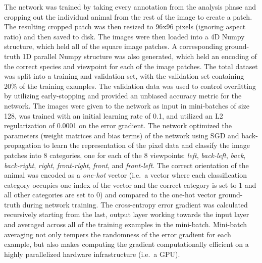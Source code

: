 The network was trained by taking every annotation from the analysis phase and cropping out the individual animal from the rest of the image to create a patch.  The resulting cropped patch was then resized to 96x96 pixels (ignoring aspect ratio) and then saved to disk.  The images were then loaded into a 4D Numpy \cite{van_der_walt_numpy_2011} structure, which held all of the square image patches.  A corresponding ground-truth 1D parallel Numpy structure was also generated, which held an encoding of the correct species and viewpoint for each of the image patches.  The total dataset was split into a training and validation set, with the validation set containing 20\% of the training examples.  The validation data was used to control overfitting by utilizing early-stopping and provided an unbiased accuracy metric for the network.  The images were given to the network as input in mini-batches of size 128, was trained with an initial learning rate of 0.1, and utilized an L2 regularization of 0.0001 on the error gradient.  The network optimized the parameters (weight matrices and bias terms) of the network using SGD and back-propagation \cite{rumelhart_learning_1988} to learn the representation of the pixel data and classify the image patches into 8 categories, one for each of the 8 viewpoints: \textit{left}, \textit{back-left}, \textit{back}, \textit{back-right}, \textit{right}, \textit{front-right}, \textit{front}, and \textit{front-left}.  The correct orientation of the animal was encoded as a \textit{one-hot} vector (i.e.\ a vector where each classification category occupies one index of the vector and the correct category is set to 1 and all other categories are set to 0) and compared to the one-hot vector ground-truth during network training.   The cross-entropy error gradient was calculated recursively starting from the last, output layer working towards the input layer and averaged across all of the training examples in the mini-batch.  Mini-batch averaging not only tempers the randomness of the error gradient for each example, but also makes computing the gradient computationally efficient on a highly parallelized hardware infrastructure (i.e.\  a GPU).

